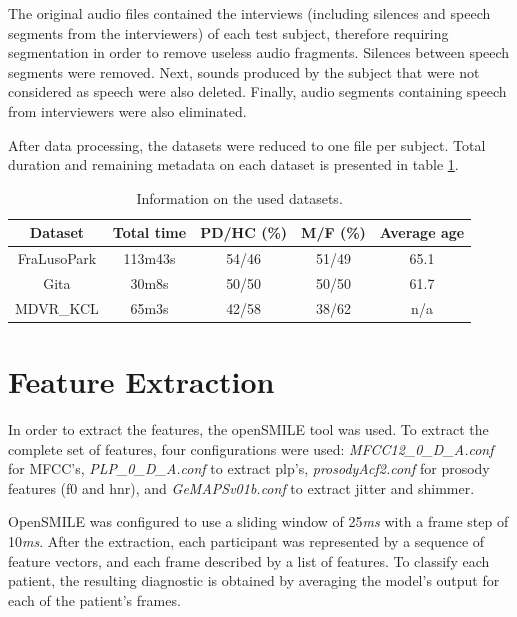 The original audio files contained the interviews (including silences and speech segments from the interviewers) of each test subject, therefore requiring segmentation in order to remove useless audio fragments. Silences between speech segments were removed. Next, sounds produced by the subject that were not considered as speech were also deleted. Finally, audio segments containing speech from interviewers were also eliminated.

After data processing, the datasets were reduced to one file per subject. Total duration and remaining metadata on each dataset is presented in table \ref{metadata123}.

\begin{table}
	\renewcommand{\arraystretch}{1.3} %
	\centering
	\begin{tabular}{ccccc}
		\textbf{Dataset} & \textbf{Total time} & \textbf{PD/HC (\%)} & \textbf{M/F (\%)} & \textbf{Average age} \\ \hline
		FraLusoPark      & 113m43s             & 54/46               & 51/49             & 65.1                 \\ \hline
		Gita             & 30m8s               & 50/50               & 50/50             & 61.7                 \\ \hline
		MDVR\_KCL        & 65m3s               & 42/58               & 38/62             & n/a                 
	\end{tabular}
	\caption{\label{metadata123}Information on the used datasets.}
\end{table}

\section{Feature Extraction}

In order to extract the features, the openSMILE \cite{openSMILE} tool was used. To extract the complete set of features, four configurations were used: \textit{MFCC12\_0\_D\_A.conf} for MFCC's, \textit{PLP\_0\_D\_A.conf} to extract \gls{plp}'s, \textit{prosodyAcf2.conf} for prosody features (\gls{f0} and \gls{hnr}), and \textit{GeMAPSv01b.conf} to extract jitter and shimmer.

OpenSMILE was configured to use a sliding window of 25\textit{ms} with a frame step of 10\textit{ms}. After the extraction, each participant was represented by a sequence of feature vectors, and each frame described by a list of features. To classify each patient, the resulting diagnostic is obtained by averaging the model's output for each of the patient's frames.

